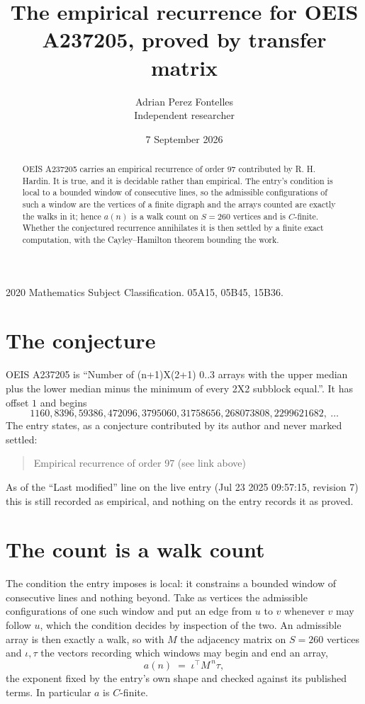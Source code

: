 \documentclass[11pt,a4paper]{article}
\title{The empirical recurrence for OEIS A237205, proved by transfer matrix}
\author{Adrian Perez Fontelles\\ \small Independent researcher}
\date{7 September 2026}
\theoremstyle{plain}
\theoremstyle{definition}
\begin{document}
\maketitle

\begin{abstract}
OEIS A237205 carries an empirical recurrence of order $97$ contributed by R. H. Hardin. It is
true, and it is decidable rather than empirical. The entry's condition is local to a bounded window of consecutive lines, so
the admissible configurations of such a window are the vertices of a finite digraph and the
arrays counted are exactly the walks in it; hence $a(n)$ is a walk count on $S=260$ vertices
and is $C$-finite. Whether the conjectured recurrence annihilates it is then settled by a
finite exact computation, with the Cayley--Hamilton theorem bounding the work.
\end{abstract}

\noindent\small 2020 Mathematics Subject Classification. 05A15, 05B45, 15B36.\normalsize

\section{The conjecture}

OEIS A237205 is ``Number of (n+1)X(2+1) 0..3 arrays with the upper median plus the lower median minus the minimum of every 2X2 subblock equal.''. It has offset $1$ and begins
\[
1160, 8396, 59386, 472096, 3795060, 31758656, 268073808, 2299621682,\ \dots
\]
The entry states, as a conjecture contributed by its author and never marked settled:
\begin{quote}
Empirical recurrence of order 97 (see link above)
\end{quote}
As of the ``Last modified'' line on the live entry (Jul 23 2025 09:57:15, revision 7) this is still
recorded as empirical, and nothing on the entry records it as proved.

\section{The count is a walk count}

The condition the entry imposes is local: it constrains a bounded window of consecutive lines and nothing beyond. Take as
vertices the admissible configurations of one such window and put an edge from $u$ to $v$
whenever $v$ may follow $u$, which the condition decides by inspection of the two. An
admissible array is then exactly a walk, so with $M$ the adjacency matrix on $S=260$ vertices
and $\iota,\tau$ the vectors recording which windows may begin and end an array,
\[
a(n)\;=\;\iota^{\!\top}M^{\,n}\tau ,
\]
the exponent fixed by the entry's own shape and checked against its published terms. In
particular $a$ is $C$-finite.
\end{document}
